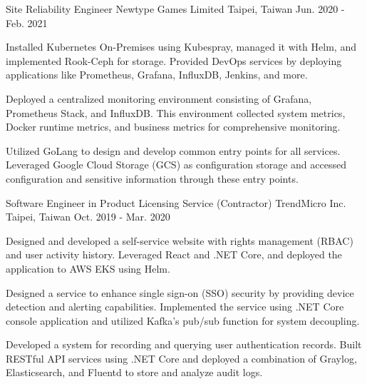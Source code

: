 \begin{cventries}
\cventry
{Site Reliability Engineer} %
{Newtype Games Limited} %
{Taipei, Taiwan} %
{Jun. 2020 - Feb. 2021} %
{
  \begin{cvitems} %
    \item {Installed Kubernetes On-Premises using Kubespray, managed it with Helm, and implemented Rook-Ceph for storage. Provided DevOps services by deploying applications like Prometheus, Grafana, InfluxDB, Jenkins, and more.}
    \item {Deployed a centralized monitoring environment consisting of Grafana, Prometheus Stack, and InfluxDB. This environment collected system metrics, Docker runtime metrics, and business metrics for comprehensive monitoring.}
    \item {Utilized GoLang to design and develop common entry points for all services. Leveraged Google Cloud Storage (GCS) as configuration storage and accessed configuration and sensitive information through these entry points.}
  \end{cvitems}
}

\cventry
{Software Engineer in Product Licensing Service (Contractor)} %
{TrendMicro Inc.} %
{Taipei, Taiwan} %
{Oct. 2019 - Mar. 2020} %
{
  \begin{cvitems} %
    \item {Designed and developed a self-service website with rights management (RBAC) and user activity history. Leveraged React and .NET Core, and deployed the application to AWS EKS using Helm.}
    \item {Designed a service to enhance single sign-on (SSO) security by providing device detection and alerting capabilities. Implemented the service using .NET Core console application and utilized Kafka's pub/sub function for system decoupling.}
    \item {Developed a system for recording and querying user authentication records. Built RESTful API services using .NET Core and deployed a combination of Graylog, Elasticsearch, and Fluentd to store and analyze audit logs.}
  \end{cvitems}
}


\end{cventries}
